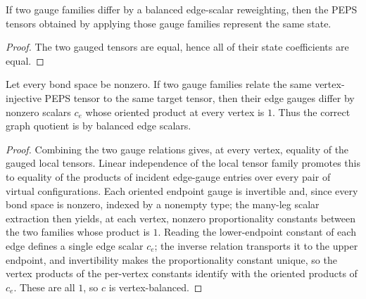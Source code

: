 \begin{theorem}%
    \label{thm:GaugeEquivModEdgeScalars_applyGauge_sameState}
    \leanok
    If two gauge families differ by a balanced edge-scalar reweighting, then
    the PEPS tensors obtained by applying those gauge families represent the
    same state.
\end{theorem}

\begin{proof}\leanok
    The two gauged tensors are equal, hence all of their state coefficients are
    equal.
\end{proof}

\begin{theorem}%
    \label{thm:gauge_unique_mod_edge_scalars}
    \leanok
    Let every bond space be nonzero. If two gauge families relate the same
    vertex-injective PEPS tensor to the same target tensor, then their edge
    gauges differ by nonzero scalars $c_e$ whose oriented product at every
    vertex is $1$. Thus the correct graph quotient is by balanced edge scalars.
\end{theorem}

\begin{proof}\leanok
    Combining the two gauge relations gives, at every vertex, equality of the
    gauged local tensors. Linear independence of the local tensor family
    promotes this to equality of the products of incident edge-gauge entries
    over every pair of virtual configurations. Each oriented endpoint gauge is
    invertible and, since every bond space is nonzero, indexed by a nonempty
    type; the many-leg scalar extraction then yields, at each vertex, nonzero
    proportionality constants between the two families whose product is $1$.
    Reading the lower-endpoint constant of each edge defines a single edge
    scalar $c_e$; the inverse relation transports it to the upper endpoint, and
    invertibility makes the proportionality constant unique, so the vertex
    products of the per-vertex constants identify with the oriented products of
    $c_e$. These are all $1$, so $c$ is vertex-balanced.
\end{proof}

